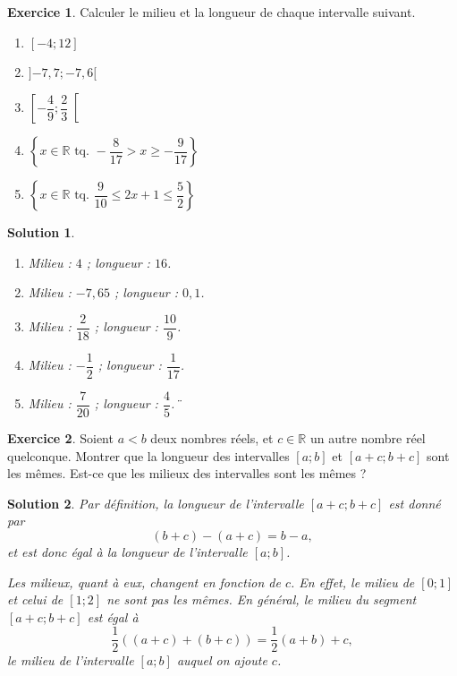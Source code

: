 \documentclass[a4paper, 14pt]{extarticle}
\theoremstyle{plain}
\newtheorem*{sol}{Solution}
\theoremstyle{definition}
\newtheorem{ex}{Exercice}
\newcommand{\R}{\mathbb{R}}
\newcommand{\exe}[2]{
		\begin{ex} #1  \end{ex}
		\begin{sol} #2 \end{sol}
	}
\newcommand{\exe}[2]{
		\begin{ex} #1  \end{ex}
	}
\begin{document}
\exe{
	Calculer le milieu et la longueur de chaque intervalle suivant.
	\ifdys
	\else
	\begin{multicols}{2}
	\fi
	\begin{enumerate}
		\item $[-4 ; 12]$
		\item $]{-7}{,}7 ; -7{,}6[$
		\item $\left[-\dfrac49 ; \dfrac23 \right[$
		\item $\left\{ x \in \R \text{ tq. } -\dfrac{8}{17} > x \geq -\dfrac9{17} \right\}$
		\item $\left\{ x \in \R \text{ tq. } \dfrac{9}{10} \leq 2x + 1 \leq \dfrac{5}{2} \right\}$
	\end{enumerate}
	\ifdys
	\else
	\end{multicols}
	\fi
}{
	\ifdys
	\else
	\begin{multicols}{2}
	\fi
	\begin{enumerate}
		\item  Milieu : $4$ ; longueur : $16$.
		\item  Milieu : ${-}7{,}65$ ; longueur : $0{,}1$.
		\item  Milieu : $\dfrac2{18}$ ; longueur : $\dfrac{10}9$.
		\item  Milieu : $-\dfrac12$ ; longueur : $\dfrac{1}{17}$.
		 \item Milieu : $\dfrac{7}{20}$ ; longueur : $\dfrac45$.¨
	\end{enumerate}
	\ifdys
	\else
	\end{multicols}
	\fi
}

\exe{
	Soient $a < b$ deux nombres réels, et $c\in\R$ un autre nombre réel quelconque.
	Montrer que la longueur des intervalles $[a ; b]$ et $[a+c ; b+c]$ sont les mêmes.
	Est-ce que les milieux des intervalles sont les mêmes ?
}{
	Par définition, la longueur de l'intervalle $[a+c;b+c]$ est donné par
		\[ (b+c) - (a+c)= b - a, \]
	et est donc égal à la longueur de l'intervalle $[a;b]$.
	
	Les milieux, quant à eux, changent en fonction de $c$. En effet, le milieu de $[0;1]$ et celui de $[1;2]$ ne sont pas les mêmes.
	En général, le milieu du segment $[a+c ; b+c]$ est égal à
		\[ \dfrac12 \left( (a+c) + (b+c) \right) = \dfrac12 (a+b) + c, \]
	le milieu de l'intervalle $[a;b]$ auquel on ajoute $c$.

}
\end{document}
